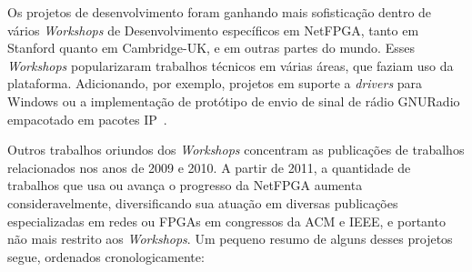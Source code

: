 Os projetos de desenvolvimento foram ganhando mais sofisticação
dentro de vários \textit{Workshops} de Desenvolvimento específicos
em NetFPGA, tanto em Stanford quanto em Cambridge-UK, e em outras
partes do mundo.  Esses \textit{Workshops} popularizaram trabalhos
técnicos em várias áreas, que faziam uso da plataforma. Adicionando,
por exemplo, projetos em suporte a \textit{drivers} para Windows ou
a implementação de protótipo de envio de sinal de rádio GNURadio
empacotado em pacotes IP~\cite{airnetfpga}.

Outros trabalhos oriundos dos \textit{Workshops} concentram as
publicações de trabalhos relacionados nos anos de 2009 e 2010. A
partir de 2011, a quantidade de trabalhos que usa ou avança o
progresso da NetFPGA aumenta consideravelmente, diversificando sua
atuação em diversas publicações especializadas em redes ou FPGAs em
congressos da ACM e IEEE, e portanto não mais restrito aos
\textit{Workshops}. Um pequeno resumo de alguns desses projetos
segue, ordenados cronologicamente:

